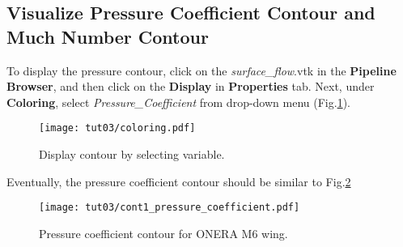 \subsection{Visualize Pressure Coefficient Contour and Much Number Contour}
To display the pressure contour, click on the \textit{surface\_flow}.vtk in the \textbf{Pipeline Browser}, and then click on the \textbf{Display} in \textbf{Properties} tab. Next, under \textbf{Coloring}, select \textit{Pressure\_Coefficient} from drop-down menu (Fig.\ref{fig3:pressure_coeff_1}).
\begin{figure}[htbp]
    \centering
    \texttt{[image: tut03/coloring.pdf]}
    \caption{Display contour by selecting variable.}
    \label{fig3:pressure_coeff_1}
\end{figure}
Eventually, the pressure coefficient contour should be similar to Fig.\ref{fig3:plot_pressure_coeff}
\begin{figure}[htbp]
    \centering
    \texttt{[image: tut03/cont1\_pressure\_coefficient.pdf]}
    \caption{Pressure coefficient contour for ONERA M6 wing.}
    \label{fig3:plot_pressure_coeff}
\end{figure}

